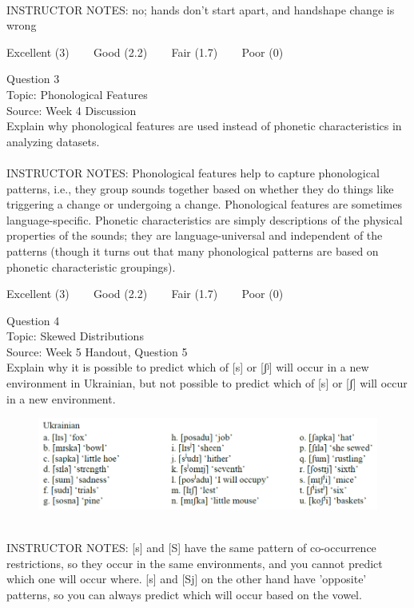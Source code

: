 \documentclass[12pt]{article}
\begin{document}
~\\
INSTRUCTOR NOTES: no; hands don't start apart, and handshape change is wrong


\vfill
Excellent (3) ~~~ Good (2.2) ~~~ Fair (1.7) ~~~ Poor (0)
\newpage

{\large Question 3}\\

Topic: Phonological Features\\
Source: Week 4 Discussion\\

Explain why phonological features are used instead of phonetic characteristics in analyzing datasets.\\


~\\
INSTRUCTOR NOTES: Phonological features help to capture phonological patterns, i.e., they group sounds together based on whether they do things like triggering a change or undergoing a change. Phonological features are sometimes language-specific. Phonetic characteristics are simply descriptions of the physical properties of the sounds; they are language-universal and independent of the patterns (though it turns out that many phonological patterns are based on phonetic characteristic groupings).


\vfill
Excellent (3) ~~~ Good (2.2) ~~~ Fair (1.7) ~~~ Poor (0)
\newpage

{\large Question 4}\\

Topic: Skewed Distributions\\
Source: Week 5 Handout, Question 5\\

Explain why it is possible to predict which of [s] or [ʃʲ] will occur in a new environment in Ukrainian, but not possible to predict which of [s] or [ʃ] will occur in a new environment.\\

\begin{figure}[H]
\includegraphics{../images/ukrainian.png}
\end{figure}

~\\
INSTRUCTOR NOTES: [s] and [S] have the same pattern of co-occurrence restrictions, so they occur in the same environments, and you cannot predict which one will occur where. [s] and [Sj] on the other hand have 'opposite' patterns, so you can always predict which will occur based on the vowel.
\end{document}
